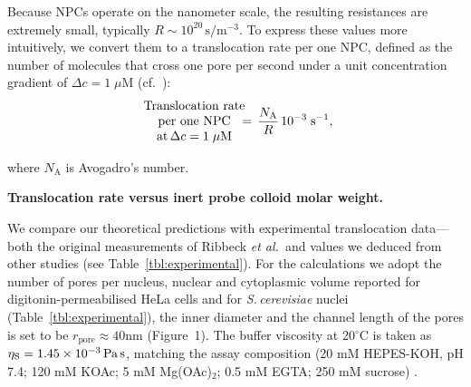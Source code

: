 \documentclass[10pt, a4paper, twocolumn]{article}
\begin{document}
Because NPCs operate on the nanometer scale, the resulting resistances are extremely small, typically
$R\sim10^{20}\,\text{s}/\text{m}^{-3}$.  
To express these values more intuitively, we convert them to a
translocation rate per one NPC, defined as the number of molecules that cross one pore per second under a unit concentration gradient of $\Delta c = 1\;\mu\text{M}$ (cf.~\cite{Ribbeck2001}):
\begin{equation}
    \begin{array}{c}
        \text{Translocation rate} \\
        \text{per one NPC}\\
        \text{at} \, \Delta c = 1\;\mu\text{M}
    \end{array}
    \hspace{-1em}= \,\frac{N_{\mathrm{A}}}{R}\,10^{-3}\;\text{s}^{-1},
\end{equation}

where \(N_{\mathrm{A}}\) is Avogadro's number.


\textbf{Translocation rate versus inert probe colloid molar weight.}


We compare our theoretical predictions with experimental translocation data—both the original measurements of Ribbeck \textit{et al.}\,\cite{Ribbeck2001} and values we deduced from other studies \cite{Mohr2009,Popken2015,Timney2016,Frey2018} (see Table~\ref{tbl:experimental}).  
For the calculations we adopt the number of pores per nucleus, nuclear and cytoplasmic volume reported for digitonin-permeabilised HeLa cells \cite{Ribbeck2001} and for \textit{S.\,cerevisiae} nuclei \cite{Timney2016} (Table~\ref{tbl:experimental}), the inner diameter and the channel length of the pores is set to be $r_{\text{pore}}\approx 40 \text{nm}$ (Figure~1).
The buffer viscosity at 20$^\circ$C is taken as $\eta_{\text{S}} = 1.45\times10^{-3}\,\text{Pa\,s}$, matching the assay composition (20 mM HEPES-KOH, pH 7.4; 120 mM KOAc; 5 mM Mg(OAc)$_2$; 0.5 mM EGTA; 250 mM sucrose) \cite{Ribbeck2001}.
\end{document}
